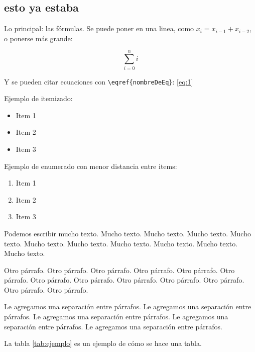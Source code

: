 \documentclass[10pt,a4paper]{article}
\begin{document}
\newpage %



\subsection{esto ya estaba}

Lo principal: las fórmulas. Se puede poner en una linea, como $x_i = x_{i-1} + x_{i-2}$, o ponerse más grande:

\begin{equation}
	\sum\limits_{i=0}^{n} i
	\label{eq:1}
\end{equation}

Y se pueden citar ecuaciones con \verb|\eqref{nombreDeEq}|: \eqref{eq:1}

Ejemplo de itemizado:

\begin{itemize}
	\item Item 1
	\item Item 2
	\item Item 3
\end{itemize}

Ejemplo de enumerado con menor distancia entre items:

\begin{enumerate} \setlength\itemsep{0cm}
	\item Item 1
	\item Item 2
	\item Item 3
\end{enumerate}

Podemos escribir mucho texto. Mucho texto. Mucho texto. Mucho texto. Mucho texto. Mucho texto. Mucho texto. Mucho texto. Mucho texto. Mucho texto. Mucho texto.

Otro párrafo. Otro párrafo. Otro párrafo. Otro párrafo. Otro párrafo. Otro párrafo. Otro párrafo. Otro párrafo. Otro párrafo. Otro párrafo. Otro párrafo. Otro párrafo. Otro párrafo.

\vspace{0.3cm}

Le agregamos una separación entre párrafos. Le agregamos una separación entre párrafos. Le agregamos una separación entre párrafos. Le agregamos una separación entre párrafos. Le agregamos una separación entre párrafos.

\vspace{0.3cm}

La tabla \ref{tab:ejemplo} es un ejemplo de cómo se hace una tabla.
\end{document}
